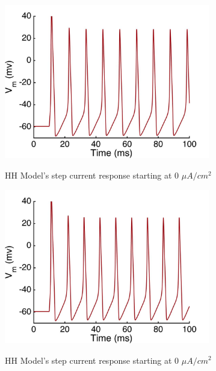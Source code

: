 \documentclass{beamer}
\begin{document}
\begin{frame}
  \begin{figure}
    \centering
    \includegraphics[width = 0.8\textwidth]{./images/current_0_25.jpg}

    HH Model's step current response starting at 0 $\mu A/cm^2$
  \end{figure}
\end{frame}


\begin{frame}
  \begin{figure}
    \centering
    \includegraphics[width = 0.8\textwidth]{./images/current_0_30.jpg}

    HH Model's step current response starting at 0 $\mu A/cm^2$
  \end{figure}
\end{frame}
\end{document}
